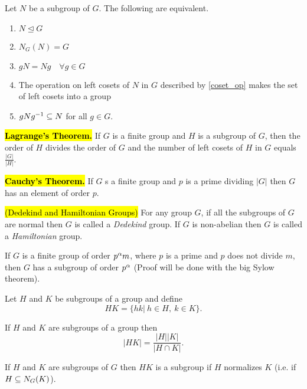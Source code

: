 \nl

\begin{thm}
Let $N$ be a subgroup of $G$. The following are equivalent.
\begin{enumerate}
\item $N\unlhd G$
\item $N_G(N) = G$
\item $gN = Ng \quad \forall g\in G$
\item The operation on left cosets of $N$ in $G$ described by \autoref{coset_op} makes the set of left cosets into a group
\item $gNg^{-1} \subseteq N$ for all $g\in G$.
\end{enumerate}
\end{thm}

\hl{\textbf{Lagrange's Theorem.}} If $G$ is a finite group and $H$ is a subgroup of $G$, then the order of $H$ divides the order of $G$ and the number of left cosets of $H$ in $G$ equals $\frac{|G|}{|H|}$.

\hl{\textbf{Cauchy's Theorem.}} If $G$ s a finite group and $p$ is a prime dividing $|G|$ then $G$ has an element of order $p$.

\nl

\begin{defn}\hl{(Dedekind and Hamiltonian Groups)}
For any group $G$, if all the subgroups of $G$ are normal then $G$ is called a \textit{Dedekind} group. If $G$ is non-abelian then $G$ is called a \textit{Hamiltonian} group.
\end{defn}

\nl
\begin{thm}
If $G$ is a finite group of order $p^\alpha m$, where $p$ is a prime and $p$ does not divide $m$, then $G$ has a subgroup of order $p^\alpha$ (Proof will be done with the big Sylow theorem).
\end{thm}

\nl
\begin{defn}
Let $H$ and $K$ be subgroups of a group and define
\[HK = \{hk |\ h\in H,\ k\in K\}.\]
\end{defn}

\begin{prop}
If $H$ and $K$ are subgroups of a group then
\[|HK| = \frac{|H||K|}{|H\cap K|}.\]
\end{prop}

\begin{cor}
If $H$ and $K$ are subgroups of $G$ then $HK$ is a subgroup if $H$ normalizes $K$ (i.e. if $H\subseteq N_G(K)$).
\end{cor}



